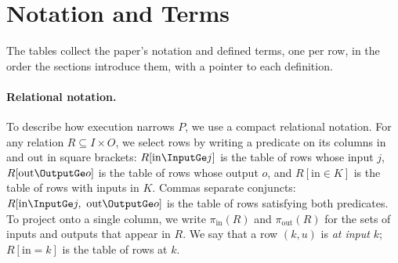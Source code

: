 \section{Notation and Terms}
\label{app:notation}

The tables collect the paper's notation and defined terms, one per row, in the
order the sections introduce them, with a pointer to each definition.

\paragraph{Relational notation.}
To describe how execution narrows $P$, we use a compact relational notation.
For any relation
$R\subseteq I\times O$, we select rows by writing a predicate on its
columns $\mathrm{in}$ and $\mathrm{out}$ in square brackets: $R[\mathrm{in}\InputGe j]$ is the table of rows
whose input \inrel $j$, $R[\mathrm{out}\OutputGe o]$ is the table of rows
whose output \outrel $o$, and $R[\mathrm{in}\in K]$ is
the table of rows with inputs in $K$.  Commas separate conjuncts:
$R[\mathrm{in}\InputGe j,\ \mathrm{out}\OutputGe o]$ is the table of rows
satisfying both predicates.
To project onto a single column, we write $\pi_{\mathrm{in}}(R)$ and
$\pi_{\mathrm{out}}(R)$ for the sets of inputs and outputs that appear in $R$.
We say that a row $(k,u)$ is \emph{at input} $k$; $R[\mathrm{in}=k]$ is the table of
rows at $k$.

